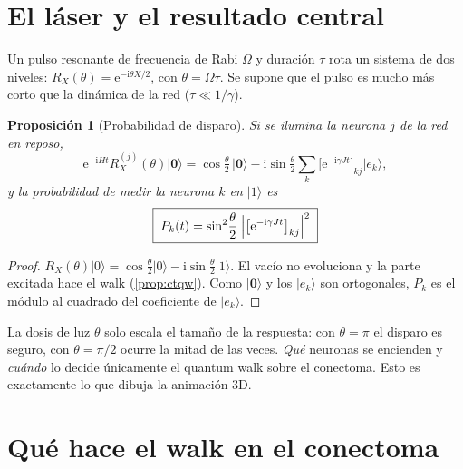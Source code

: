 \documentclass[11pt,a4paper]{article}
\renewcommand{\ket}[1]{\lvert #1\rangle}
\newcommand{\vac}{\ket{\mathbf{0}}}
\newcommand{\e}{\mathrm{e}}
\newcommand{\ii}{\mathrm{i}}
\newcommand{\RX}{R_X}
\theoremstyle{plain}
\newtheorem{proposicion}{Proposición}[section]
\theoremstyle{definition}
\theoremstyle{remark}
\begin{document}
\section{El láser y el resultado central}
\label{sec:laser}

Un pulso resonante de frecuencia de Rabi $\Omega$ y duración $\tau$ rota un sistema de dos niveles: $\RX(\theta)=\e^{-\ii\theta X/2}$, con $\theta=\Omega\tau$. Se supone que el pulso es mucho más corto que la dinámica de la red ($\tau\ll1/\gamma$).

\begin{proposicion}[Probabilidad de disparo]\label{prop:central}
Si se ilumina la neurona $j$ de la red en reposo,
\begin{equation}
\e^{-\ii Ht}\RX^{(j)}(\theta)\vac=\cos\tfrac\theta2\,\vac-\ii\sin\tfrac\theta2\sum_k\bigl[\e^{-\ii\gamma Jt}\bigr]_{kj}\ket{e_k},
\end{equation}
y la probabilidad de medir la neurona $k$ en $\ket1$ es
\begin{equation}
\boxed{\;P_k(t)=\sin^2\!\frac\theta2\;\Bigl|\bigl[\e^{-\ii\gamma Jt}\bigr]_{kj}\Bigr|^2\;}
\label{eq:central}
\end{equation}
\end{proposicion}

\begin{proof}
$\RX(\theta)\ket0=\cos\frac\theta2\ket0-\ii\sin\frac\theta2\ket1$. El vacío no evoluciona y la parte excitada hace el walk (\cref{prop:ctqw}). Como $\vac$ y los $\ket{e_k}$ son ortogonales, $P_k$ es el módulo al cuadrado del coeficiente de $\ket{e_k}$.
\end{proof}

\begin{idea}
La dosis de luz $\theta$ solo escala el tamaño de la respuesta: con $\theta=\pi$ el disparo es seguro, con $\theta=\pi/2$ ocurre la mitad de las veces. \emph{Qué} neuronas se encienden y \emph{cuándo} lo decide únicamente el quantum walk sobre el conectoma. Esto es exactamente lo que dibuja la animación 3D.
\end{idea}

\section{Qué hace el walk en el conectoma}
\label{sec:resultados}
\end{document}
